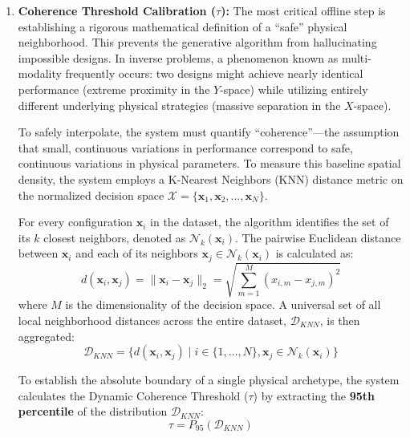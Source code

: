 \begin{enumerate}
    \item \textbf{Coherence Threshold Calibration ($\tau$):} The most critical offline step is establishing a rigorous mathematical definition of a ``safe'' physical neighborhood. This prevents the generative algorithm from hallucinating impossible designs. In inverse problems, a phenomenon known as multi-modality frequently occurs: two designs might achieve nearly identical performance (extreme proximity in the $Y$-space) while utilizing entirely different underlying physical strategies (massive separation in the $X$-space). 
    
    To safely interpolate, the system must quantify ``coherence''—the assumption that small, continuous variations in performance correspond to safe, continuous variations in physical parameters. To measure this baseline spatial density, the system employs a K-Nearest Neighbors (KNN) distance metric \cite{cover1967nearest} on the normalized decision space $\mathcal{X} = \{\mathbf{x}_1, \mathbf{x}_2, \dots, \mathbf{x}_N\}$.
    
    For every configuration $\mathbf{x}_i$ in the dataset, the algorithm identifies the set of its $k$ closest neighbors, denoted as $\mathcal{N}_k(\mathbf{x}_i)$. The pairwise Euclidean distance between $\mathbf{x}_i$ and each of its neighbors $\mathbf{x}_j \in \mathcal{N}_k(\mathbf{x}_i)$ is calculated as:
    \begin{equation}
        d(\mathbf{x}_i, \mathbf{x}_j) = \|\mathbf{x}_i - \mathbf{x}_j\|_2 = \sqrt{\sum_{m=1}^{M} (x_{i,m} - x_{j,m})^2}
    \end{equation}
    where $M$ is the dimensionality of the decision space. A universal set of all local neighborhood distances across the entire dataset, $\mathcal{D}_{KNN}$, is then aggregated:
    \begin{equation}
        \mathcal{D}_{KNN} = \Big\{ d(\mathbf{x}_i, \mathbf{x}_j) \mid i \in \{1, \dots, N\}, \mathbf{x}_j \in \mathcal{N}_k(\mathbf{x}_i) \Big\}
    \end{equation}
    
    To establish the absolute boundary of a single physical archetype, the system calculates the Dynamic Coherence Threshold ($\tau$) by extracting the \textbf{95th percentile} of the distribution $\mathcal{D}_{KNN}$:
    \begin{equation}
        \tau = P_{95}(\mathcal{D}_{KNN})
    \end{equation}
    

\end{enumerate}
